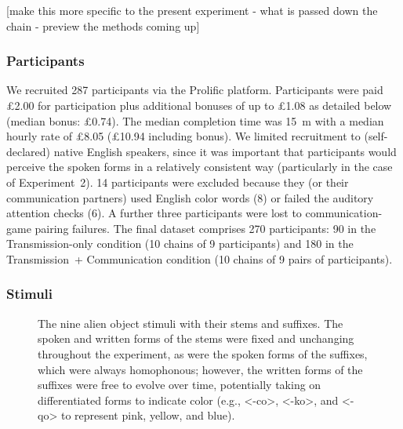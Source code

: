 \documentclass[doc,biblatex]{apa7}
\begin{document}
[make this more specific to the present experiment - what is passed down the chain - preview the methods coming up]

\subsubsection{Participants}

We recruited 287 participants via the Prolific platform. Participants were paid £2.00 for participation plus additional bonuses of up to £1.08 as detailed below (median bonus: £0.74). The median completion time was 15~m with a median hourly rate of £8.05 (£10.94 including bonus). We limited recruitment to (self-declared) native English speakers, since it was important that participants would perceive the spoken forms in a relatively consistent way (particularly in the case of Experiment~2). 14 participants were excluded because they (or their communication partners) used English color words (8) or failed the auditory attention checks (6). A further three participants were lost to communication-game pairing failures. The final dataset comprises 270 participants: 90 in the Transmission-only condition (10 chains of 9 participants) and 180 in the Transmission~+ Communication condition (10 chains of 9 pairs of participants).

\subsubsection{Stimuli}

	\begin{figure}
	\vspace*{2pt}
	\caption{The nine alien object stimuli with their stems and suffixes. The spoken and written forms of the stems were fixed and unchanging throughout the experiment, as were the spoken forms of the suffixes, which were always homophonous; however, the written forms of the suffixes were free to evolve over time, potentially taking on differentiated forms to indicate color (e.g., <-co>, <-ko>, and <-qo> to represent pink, yellow, and blue).}
	\label{stimuli}
	\end{figure}
\end{document}
